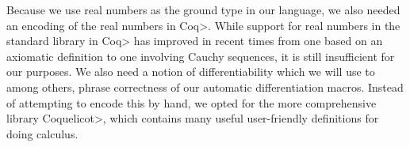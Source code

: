 Because we use real numbers as the ground type in our language, we also needed an encoding of the real numbers in \<Coq>.
While support for real numbers in the standard library in \<Coq> has improved in recent times from one based on an axiomatic definition to one involving Cauchy sequences, it is still insufficient for our purposes.
We also need a notion of differentiability which we will use to among others, phrase correctness of our automatic differentiation macros.
Instead of attempting to encode this by hand, we opted for the more comprehensive library \<Coquelicot>\cite{Boldo2015CoquelicotAU}, which contains many useful user-friendly definitions for doing calculus.
